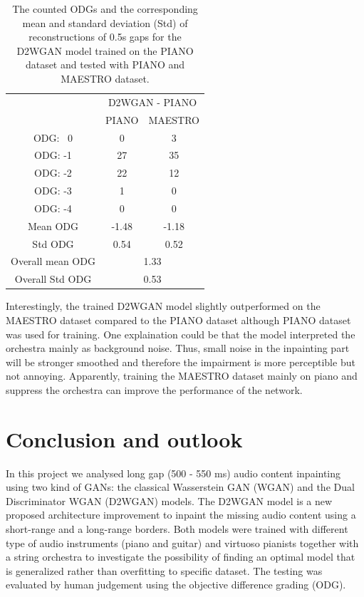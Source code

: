 \documentclass{article} %
\begin{document}
\begin{table}[ht]
    \centering
    \begin{tabular}{c | c c}
         \hline
         & \multicolumn{2}{c}{D2WGAN - PIANO}\\
         & PIANO & MAESTRO \\
        \hline
        ODG: \ 0   & 0 & 3 \\
        ODG: -1    & 27 & 35 \\
        ODG: -2    & 22 & 12 \\
        ODG: -3    & 1 & 0 \\
        ODG: -4    & 0 & 0 \\
        \hline
        Mean ODG    & -1.48 & -1.18 \\
        Std ODG     & 0.54 & 0.52 \\
        \hline
        Overall mean ODG & \multicolumn{2}{c}{1.33} \\
        Overall Std ODG & \multicolumn{2}{c}{0.53}  \\
        \hline
    \end{tabular}
    \caption{The counted ODGs and the corresponding mean and standard deviation (Std) of reconstructions of 0.5s gaps for the D2WGAN model trained on the PIANO dataset and tested with PIANO and MAESTRO dataset.}
    \label{tab:odgs_spec}
\end{table}

Interestingly, the trained D2WGAN model slightly outperformed on the MAESTRO dataset compared to the PIANO dataset although PIANO dataset was used for training. One explaination could be that the model interpreted the orchestra mainly as background noise. Thus, small noise in the inpainting part will be stronger smoothed and therefore the impairment is more perceptible but not annoying. Apparently, training the MAESTRO dataset mainly on piano and suppress the orchestra can improve the performance of the network.


\section{Conclusion and outlook}
In this project we analysed long gap (500 - 550 ms) audio content inpainting using two kind of GANs: the classical Wasserstein GAN (WGAN) and the Dual Discriminator WGAN (D2WGAN) models. The D2WGAN model is a new proposed architecture improvement to inpaint the missing audio content using a short-range and a long-range borders. Both models were trained with different type of audio instruments (piano and guitar) and virtuoso pianists together with a string orchestra to investigate the possibility of finding an optimal model that is generalized rather than overfitting to specific dataset. The testing was evaluated by human judgement using the objective difference grading (ODG).
\end{document}

